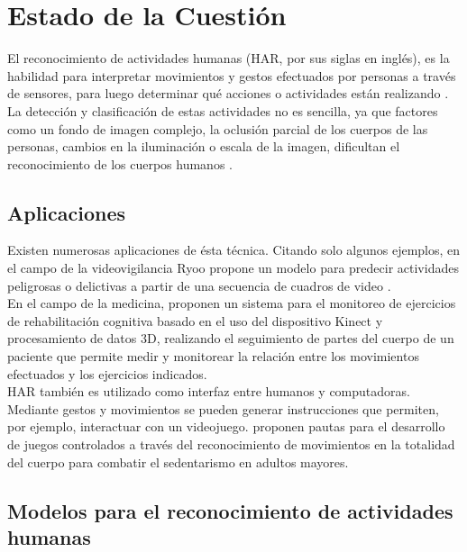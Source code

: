 \chapter{Estado de la Cuestión} \label{StateArt}

El reconocimiento de actividades humanas (HAR, por sus siglas en inglés), es la habilidad para interpretar movimientos y gestos efectuados por personas a través de sensores, para luego determinar qué acciones o actividades están realizando \citep{Ann2014}. \\

La detección y clasificación de estas actividades no es sencilla, ya que factores como un fondo de imagen complejo, la oclusión parcial de los cuerpos de las personas, cambios en la iluminación o escala de la imagen, dificultan el reconocimiento de los cuerpos humanos \citep{Vrigkas2015}. 


\section{Aplicaciones}

Existen numerosas aplicaciones de ésta técnica. Citando solo algunos ejemplos, en el campo de la videovigilancia Ryoo propone un modelo para predecir actividades peligrosas o delictivas a partir de una secuencia de cuadros de video \citep{Ryoo2011}.\\ 

En el campo de la medicina, \citep{Gonzalez-Ortega2014} proponen un sistema para el monitoreo de ejercicios de rehabilitación cognitiva basado en el uso del dispositivo Kinect y procesamiento de datos 3D, realizando el seguimiento de partes del cuerpo de un paciente que permite medir y monitorear la relación entre los movimientos efectuados y los ejercicios indicados. \\

HAR también es utilizado como interfaz entre humanos y computadoras. Mediante gestos y movimientos se pueden generar instrucciones que permiten, por ejemplo, interactuar con un videojuego. \citep{Gerling2012} proponen pautas para el desarrollo de juegos controlados a través del reconocimiento de movimientos en la totalidad del cuerpo para combatir el sedentarismo en adultos mayores. \\

\section{Modelos para el reconocimiento de actividades humanas}

